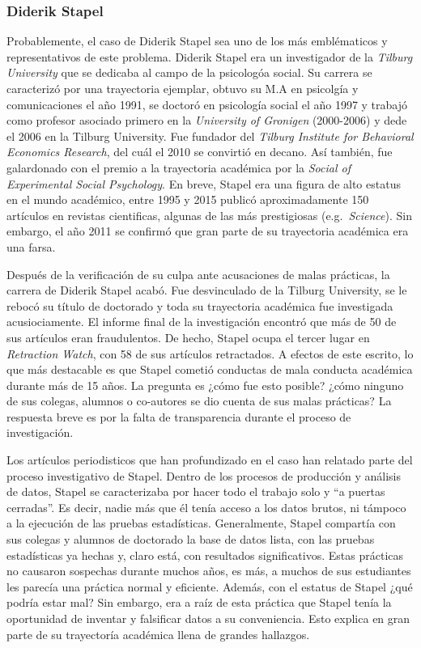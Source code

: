 \documentclass[
]{book}
\begin{document}
\hypertarget{diderik-stapel}{%
\subsubsection{Diderik Stapel}\label{diderik-stapel}}

Probablemente, el caso de Diderik Stapel sea uno de los más emblématicos y representativos de este problema. Diderik Stapel era un investigador de la \emph{Tilburg University} que se dedicaba al campo de la psicologóa social. Su carrera se caracterizó por una trayectoria ejemplar, obtuvo su M.A en psicolgía y comunicaciones el año 1991, se doctoró en psicología social el año 1997 y trabajó como profesor asociado primero en la \emph{University of Gronigen} (2000-2006) y dede el 2006 en la Tilburg University. Fue fundador del \emph{Tilburg Institute for Behavioral Economics Research}, del cuál el 2010 se convirtió en decano. Así también, fue galardonado con el premio a la trayectoria académica por la \emph{Social of Experimental Social Psychology}. En breve, Stapel era una figura de alto estatus en el mundo académico, entre 1995 y 2015 publicó aproximadamente 150 artículos en revistas cientificas, algunas de las más prestigiosas (e.g.~\emph{Science}). Sin embargo, el año 2011 se confirmó que gran parte de su trayectoria académica era una farsa.

Después de la verificación de su culpa ante acusaciones de malas prácticas, la carrera de Diderik Stapel acabó. Fue desvinculado de la Tilburg University, se le rebocó su título de doctorado y toda su trayectoria académica fue investigada acusiociamente. El informe final de la investigación encontró que más de 50 de sus artículos eran fraudulentos. De hecho, Stapel ocupa el tercer lugar en \emph{Retraction Watch}, con 58 de sus artículos retractados. A efectos de este escrito, lo que más destacable es que Stapel cometió conductas de mala conducta académica durante más de 15 años. La pregunta es ¿cómo fue esto posible? ¿cómo ninguno de sus colegas, alumnos o co-autores se dio cuenta de sus malas prácticas? La respuesta breve es por la falta de transparencia durante el proceso de investigación.

Los artículos periodisticos que han profundizado en el caso \citep[e.g.][]{carey_Fraud_2011} han relatado parte del proceso investigativo de Stapel. Dentro de los procesos de producción y análisis de datos, Stapel se caracterizaba por hacer todo el trabajo solo y ``a puertas cerradas''. Es decir, nadie más que él tenía acceso a los datos brutos, ni támpoco a la ejecución de las pruebas estadísticas. Generalmente, Stapel compartía con sus colegas y alumnos de doctorado la base de datos lista, con las pruebas estadísticas ya hechas y, claro está, con resultados significativos. Estas prácticas no causaron sospechas durante muchos años, es más, a muchos de sus estudiantes les parecía una práctica normal y eficiente. Además, con el estatus de Stapel ¿qué podría estar mal? Sin embargo, era a raíz de esta práctica que Stapel tenía la oportunidad de inventar y falsificar datos a su conveniencia. Esto explica en gran parte de su trayectoría académica llena de grandes hallazgos.
\end{document}
